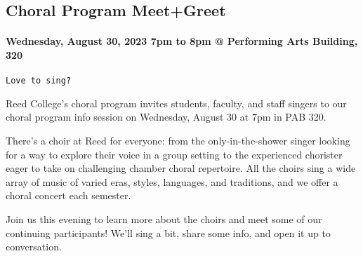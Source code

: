 \documentclass[
]{article}
\begin{document}
\hypertarget{choral-program-meetgreet}{%
\subsection{Choral Program Meet+Greet}\label{choral-program-meetgreet}}

\hypertarget{wednesday-august-30-2023-7pm-to-8pm-performing-arts-building-320}{%
\paragraph{Wednesday, August 30, 2023 7pm to 8pm @ Performing Arts
Building,
320}\label{wednesday-august-30-2023-7pm-to-8pm-performing-arts-building-320}}

\begin{verbatim}
Love to sing?
\end{verbatim}

Reed College's choral program invites students, faculty, and staff
singers to our choral program info session on Wednesday, August 30 at
7pm in PAB 320.

There's a choir at Reed for everyone: from the only-in-the-shower singer
looking for a way to explore their voice in a group setting to the
experienced chorister eager to take on challenging chamber choral
repertoire. All the choirs sing a wide array of music of varied eras,
styles, languages, and traditions, and we offer a choral concert each
semester.

Join us this evening to learn more about the choirs and meet some of our
continuing participants! We'll sing a bit, share some info, and open it
up to conversation.
\end{document}
